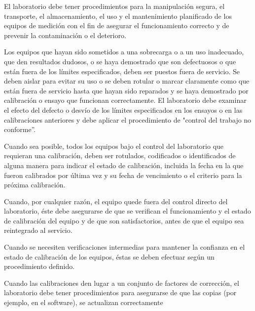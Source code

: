 			\par \noindent
				El laboratorio debe tener procedimientos para la manipulación segura, el transporte, el
				almacenamiento, el uso y el mantenimiento planificado de los equipos de medición con el fin de asegurar el
				funcionamiento correcto y de prevenir la contaminación o el deterioro.
				
			\par \noindent
				Los equipos que hayan sido sometidos a una sobrecarga o a un uso inadecuado, que den resultados
				dudosos, o se haya demostrado que son defectuosos o que están fuera de los límites especificados, deben
				ser puestos fuera de servicio. Se deben aislar para evitar su uso o se deben rotular o marcar claramente
				como que están fuera de servicio hasta que hayan sido reparados y se haya demostrado por calibración o
				ensayo que funcionan correctamente. El laboratorio debe examinar el efecto del defecto o desvío de los
				límites especificados en los ensayos o en las calibraciones anteriores y debe aplicar el procedimiento de
				"control del trabajo no conforme”.
				
			\par \noindent
				Cuando sea posible, todos los equipos bajo el control del laboratorio que requieran una calibración,
				deben ser rotulados, codificados o identificados de alguna manera para indicar el estado de calibración,
				incluida la fecha en la que fueron calibrados por última vez y su fecha de vencimiento o el criterio para la
				próxima calibración.
				
			\par \noindent
				Cuando, por cualquier razón, el equipo quede fuera del control directo del laboratorio, éste debe
				asegurarse de que se verifican el funcionamiento y el estado de calibración del equipo y de que son
				satisfactorios, antes de que el equipo sea reintegrado al servicio.
				
			\par \noindent
				Cuando se necesiten verificaciones intermedias para mantener la confianza en el estado de
				calibración de los equipos, éstas se deben efectuar según un procedimiento definido.
				
			\par \noindent
				Cuando las calibraciones den lugar a un conjunto de factores de corrección, el laboratorio debe tener
				procedimientos para asegurarse de que las copias (por ejemplo, en el software), se actualizan correctamente
				
